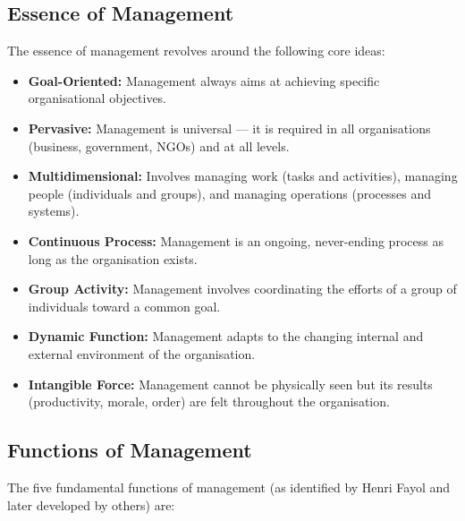 \documentclass[12pt,a4paper]{article}
\begin{document}
\subsection{Essence of Management}
The essence of management revolves around the following core ideas:
\begin{itemize}[leftmargin=*, itemsep=3pt]
  \item \textbf{Goal-Oriented:} Management always aims at achieving specific organisational objectives.
  \item \textbf{Pervasive:} Management is universal --- it is required in all organisations (business, government, NGOs) and at all levels.
  \item \textbf{Multidimensional:} Involves managing work (tasks and activities), managing people (individuals and groups), and managing operations (processes and systems).
  \item \textbf{Continuous Process:} Management is an ongoing, never-ending process as long as the organisation exists.
  \item \textbf{Group Activity:} Management involves coordinating the efforts of a group of individuals toward a common goal.
  \item \textbf{Dynamic Function:} Management adapts to the changing internal and external environment of the organisation.
  \item \textbf{Intangible Force:} Management cannot be physically seen but its results (productivity, morale, order) are felt throughout the organisation.
\end{itemize}

\subsection{Functions of Management}
The five fundamental functions of management (as identified by Henri Fayol and later developed by others) are:

\begin{tcolorbox}[tikzbox, title={Five Functions of Management}]
\centering
{}
\end{tcolorbox}
\end{document}
